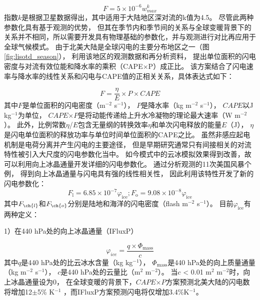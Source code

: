 \begin{equation} \label{eq:ltng_w}
F = 5\times10^{-6}w^{k}_{max}
\end{equation}
指数$k$是根据卫星数据得出，其中适用于大陆地区深对流的k值为4.5\citep{Price.1992}。
尽管此两种参数化具有基于观测的优势，
但其在季节内和季节间的关系与全球变暖背景下的关系并不相同，所以需要开发具有物理基础的参数化，并与观测进行对比再应用于全球气候模式。
由于北美大陆是全球闪电的主要分布地区之一（图\ref{fig:lisotd_season}），
\citet{Romps.2014}利用该地区的观测数据和再分析资料，
提出单位面积的闪电密度与对流有效位能和降水率的乘积（CAPE$\times$P）成正比。
该方案结合了闪电速率与降水率的线性关系\citep{Battan.1965,Petersen.1998,Tapia.1998}和闪电与CAPE值的正相关关系\citep{Williams.2005a}，具体表达式如下：

\begin{equation} \label{eq:ltng_cape}
F = \frac{\eta}{E} \times P \times CAPE
\end{equation}
其中$F$是单位面积的闪电密度（m$^{-2}$ s$^{-1}$），
$P$是降水率（kg m$^{-2}$ s$^{-1}$），
$CAPE$以J kg$^{-1}$为单位，
$CAPE$$\times$$P$是将动能传递给上升水冷凝物的理论最大速率（W m$^{-2}$）。
此外，比例常数$\eta$/$E$包含无量纲的转换效率$\eta$和单次闪电释放的能量$E$（J），
$\eta$是闪电单位面积的释放功率与单位时间单位面积的CAPE之比。
虽然非感应起电机制是电荷分离并产生闪电的主要途径\citep{Barthe.2007,Saunders.2008}，
但是早期研究通常只有间接相关的对流特性被引入大尺度的闪电参数化当中。
如今模式中的云冰模拟效果得到改善，故可以利用向上冰晶通量开发详细的闪电参数化。
\citet{Deierling.2008}通过分析观测的11次美国风暴个例，
得到向上冰晶通量与闪电具有强的线性相关性，
因此\citet{Finney.2014}利用该特性开发了新的闪电参数化：
\begin{equation} \label{eq:ltng_ice}
F_\mathrm{l} = 6.85\times10^{-7}\varphi_\mathrm{ice};
F_\mathrm{o} = 9.08\times10^{-8}\varphi_\mathrm{ice}
\end{equation}
其中$F_{\ch{l}}$和$F_{\ch{o}}$分别是陆地和海洋的闪电密度（flash m$^{-2}$ s$^{-1}$）。
目前$\varphi_\mathrm{ice}$有两种定义：

1）在440 hPa处的向上冰晶通量（IFluxP）

\begin{equation} \label{eq:ltng_iflux}
\varphi_{ice} = \frac{q\times\Phi_\mathrm{mass}}{c}
\end{equation}
其中$q$是440 hPa处的比云冰水含量（kg kg$^{-1}$），
$\Phi_\mathrm{mass}$是440 hPa处的向上质量通量（kg m$^{-2}$ s$^{-1}$），
$c$是440 hPa处的云量比（m$^2$ m$^{-2}$）。
当$c$ < 0.01 m$^2$ m$^{-2}$时，向上冰晶通量设为0，
在全球变暖的背景下，$CAPE$$\times$$P$方案预测北美大陆的闪电数将增加12$\pm$5\% K$^{-1}$ \citep{Romps.2014}，而IFluxP方案预测闪电将仅增加3.4\%K$^{-1}$。

